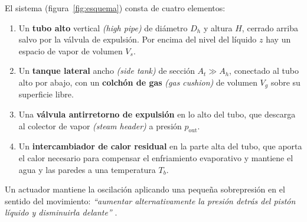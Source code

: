 \documentclass[11pt,a4paper]{article}
\newcommand{\en}[1]{\textit{(#1)}}
\begin{document}
El sistema (figura~\ref{fig:esquema}) consta de cuatro elementos:
\begin{enumerate}
  \item Un \textbf{tubo alto} vertical \en{high pipe} de diámetro $D_h$ y altura $H$, cerrado arriba salvo por la válvula de expulsión. Por encima del nivel del líquido $z$ hay un espacio de vapor de volumen $V_s$.
  \item Un \textbf{tanque lateral} ancho \en{side tank} de sección $A_t \gg A_h$, conectado al tubo alto por abajo, con un \textbf{colchón de gas} \en{gas cushion} de volumen $V_g$ sobre su superficie libre.
  \item Una \textbf{válvula antirretorno de expulsión} en lo alto del tubo, que descarga al colector de vapor \en{steam header} a presión $p_{\mathrm{out}}$.
  \item Un \textbf{intercambiador de calor residual} en la parte alta del tubo, que aporta el calor necesario para compensar el enfriamiento evaporativo y mantiene el agua y las paredes a una temperatura $T_b$.
\end{enumerate}
Un actuador mantiene la oscilación aplicando una pequeña sobrepresión en el sentido del movimiento: \emph{``aumentar alternativamente la presión detrás del pistón líquido y disminuirla delante''} \cite{hydramtech}.
\end{document}

